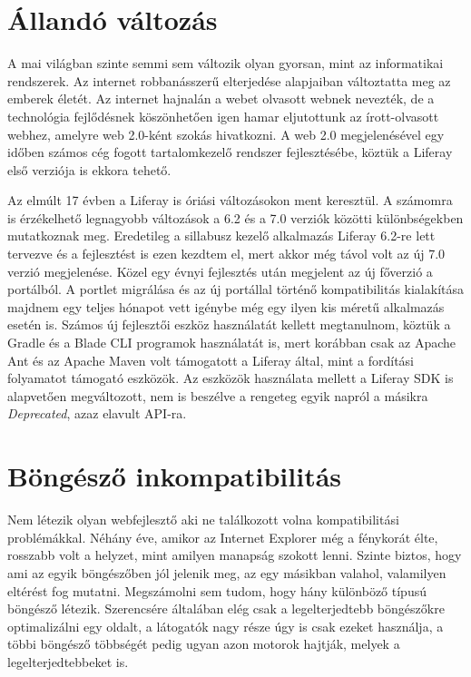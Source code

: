 \documentclass[hidelinks, 12pt, a4paper]{report}
\begin{document}
\section{Állandó változás}

A mai világban szinte semmi sem változik olyan gyorsan, mint az informatikai rendszerek. Az internet robbanásszerű elterjedése alapjaiban változtatta meg az emberek életét. Az internet hajnalán a webet olvasott webnek nevezték, de a technológia fejlődésnek köszönhetően igen hamar eljutottunk az írott-olvasott webhez, amelyre web 2.0-ként szokás hivatkozni. A web 2.0 megjelenésével egy időben számos cég fogott tartalomkezelő rendszer fejlesztésébe, köztük a Liferay első verziója is ekkora tehető.

Az elmúlt 17 évben a Liferay is óriási változásokon ment keresztül. A számomra is érzékelhető legnagyobb változások a 6.2 és a 7.0 verziók közötti különbségekben mutatkoznak meg. Eredetileg a sillabusz kezelő alkalmazás Liferay 6.2-re lett tervezve és a fejlesztést is ezen kezdtem el, mert akkor még távol volt az új 7.0 verzió megjelenése. Közel egy évnyi fejlesztés után megjelent az új főverzió a portálból. A portlet migrálása és az új portállal történő kompatibilitás kialakítása majdnem egy teljes hónapot vett igénybe még egy ilyen kis méretű alkalmazás esetén is. Számos új fejlesztői eszköz használatát kellett megtanulnom, köztük a Gradle és a Blade CLI programok használatát is, mert korábban csak az Apache Ant és az Apache Maven volt támogatott a Liferay által, mint a fordítási folyamatot támogató eszközök. Az eszközök használata mellett a Liferay SDK is alapvetően megváltozott, nem is beszélve a rengeteg egyik napról a másikra \emph{Deprecated}, azaz elavult API-ra.


\section{Böngésző inkompatibilitás}

Nem létezik olyan webfejlesztő aki ne találkozott volna kompatibilitási problémákkal. Néhány éve, amikor az Internet Explorer még a fénykorát élte, rosszabb volt a helyzet, mint amilyen manapság szokott lenni. Szinte biztos, hogy ami az egyik böngészőben jól jelenik meg, az egy másikban valahol, valamilyen eltérést fog mutatni. Megszámolni sem tudom, hogy hány különböző típusú böngésző létezik. Szerencsére általában elég csak a legelterjedtebb böngészőkre optimalizálni egy oldalt, a látogatók nagy része úgy is csak ezeket használja, a többi böngésző többségét pedig ugyan azon motorok hajtják, melyek a legelterjedtebbeket is.
\end{document}

